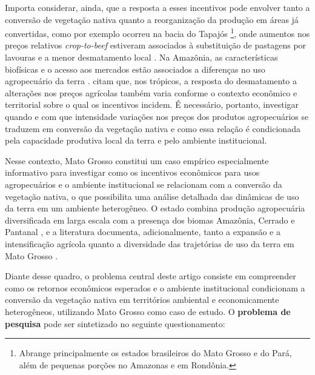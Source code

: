 Importa considerar, ainda, que a resposta a esses incentivos pode envolver tanto a conversão de vegetação nativa quanto a reorganização da produção em áreas já convertidas, como por exemplo ocorreu na bacia do Tapajós \footnote{Abrange principalmente os estados brasileiros do Mato Grosso e do Pará, além de pequenas porções no Amazonas e em Rondônia.}, onde aumentos nos preços relativos \textit{crop-to-beef} estiveram associados à substituição de pastagens por lavouras e a menor desmatamento local \cite{Braganca2018}. Na Amazônia, as características biofísicas e o acesso aos mercados estão associados a diferenças no uso agropecuário da terra \cite{ChomitzThomas2003}.  citam que, nos trópicos, a resposta do desmatamento a alterações nos preços agrícolas também varia conforme o contexto econômico e territorial sobre o qual os incentivos incidem. É necessário, portanto, investigar quando e com que intensidade variações nos preços dos produtos agropecuários se traduzem em conversão da vegetação nativa e como essa relação é condicionada pela capacidade produtiva local da terra e pelo ambiente institucional.

Nesse contexto, Mato Grosso constitui um caso empírico especialmente informativo para investigar como os incentivos econômicos para usos agropecuários e o ambiente institucional se relacionam com a conversão da vegetação nativa, o que possibilita uma análise detalhada das dinâmicas de uso da terra em um ambiente heterogêneo. O estado combina produção agropecuária diversificada em larga escala com a presença dos biomas Amazônia, Cerrado e Pantanal \cite{VanWeyEtAl2013}, e a literatura documenta, adicionalmente, tanto a expansão e a intensificação agrícola quanto a diversidade das trajetórias de uso da terra em Mato Grosso \cite{SimoesEtAl2020}.


Diante desse quadro, o problema central deste artigo consiste em compreender como os retornos econômicos esperados e o ambiente institucional condicionam a conversão da vegetação nativa em territórios ambiental e economicamente heterogêneos, utilizando Mato Grosso como caso de estudo. O \textbf{problema de pesquisa} pode ser sintetizado no seguinte questionamento:

